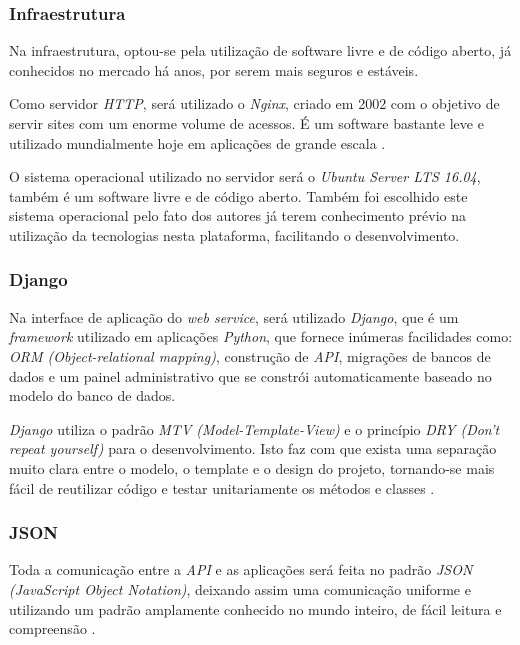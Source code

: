 \documentclass[
	12pt,
	oneside,
	a4paper,
	english,
	brazil,
]{abntex2}
\begin{document}
\subsubsection{Infraestrutura}

Na infraestrutura, optou-se pela utilização de software livre e de código aberto, já conhecidos no mercado há anos, por serem mais seguros e estáveis.

Como servidor \emph{HTTP}, será utilizado o \emph{Nginx}, criado em 2002 com o objetivo de servir sites com um enorme volume de acessos. É um software bastante leve e utilizado mundialmente hoje em aplicações de grande escala \cite{nginx-book}.

O sistema operacional utilizado no servidor será o \emph{Ubuntu Server LTS 16.04}, também é um software livre e de código aberto. Também foi escolhido este sistema operacional pelo fato dos autores já terem conhecimento prévio na utilização da tecnologias nesta plataforma, facilitando o desenvolvimento.

\subsubsection{Django}

Na interface de aplicação do \emph{web service}, será utilizado \emph{Django}, que é um \emph{framework} utilizado em aplicações \emph{Python}, que fornece inúmeras facilidades como: \emph{ORM (Object-relational mapping)}, construção de \emph{API}, migrações de bancos de dados e um painel administrativo que se constrói automaticamente baseado no modelo do banco de dados.

\emph{Django} utiliza o padrão \emph{MTV (Model-Template-View)} e o princípio \emph{DRY (Don't repeat yourself)} para o desenvolvimento. Isto faz com que exista uma separação muito clara entre o modelo, o template e o design do projeto, tornando-se mais fácil de reutilizar código e testar unitariamente os métodos e classes \cite{django-wikipedia}. 

\subsubsection{JSON}

Toda a comunicação entre a \emph{API} e as aplicações será feita no padrão \emph{JSON (JavaScript Object Notation)}, deixando assim uma comunicação uniforme e utilizando um padrão amplamente conhecido no mundo inteiro, de fácil leitura e compreensão \cite{footnote-json}.
\end{document}

